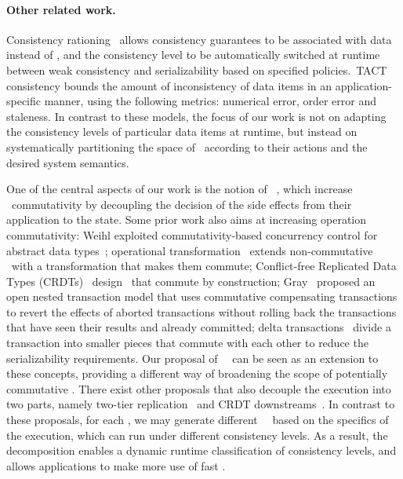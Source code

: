 \paragraph{Other related work.} Consistency rationing~\cite{Kraska2009ConsisRation} allows consistency
guarantees to be associated with data instead of \operations, and the
consistency level to be automatically switched at runtime between
weak consistency and serializability
based on specified policies.\ TACT~\cite{Yu2000TACT} consistency
bounds the amount of inconsistency of data items in an
application-specific manner, using the following metrics: numerical
error, order error and staleness. In contrast to these models, the
focus of our work is not on adapting the consistency levels of
particular data items at runtime, but instead on systematically
partitioning the space of \transactions\ according to their actions
and the desired system semantics.

One of the central aspects of our work is the notion of
\shadow\ \transactions, which increase \operation\ commutativity by
decoupling the decision of the side effects from their application to the state.
Some prior work also aims at increasing operation commutativity: Weihl exploited
com\-mut\-at\-iv\-ity-based concurrency control for abstract data types~\cite{Weihl1988Commutativity}; 
operational transformation~\cite{Ellis1989Concurrency,Feldman2010Sporc} extends
non-co\-mmutative \operations\ with a
transformation that makes them commute; Conflict-free Replicated Data
Types (CRDTs)~\cite{Shapiro2011Conflict} design \operations\ that
commute by construction; Gray~\cite{Gray1981NestedTransactions} proposed
an open nested transaction model that uses commutative compensating
transactions to revert the effects of aborted transactions without
rolling back the transactions that have seen their results and already
committed; delta transactions~\cite{deltaTxBlog} divide a transaction
into smaller pieces that commute with each other to reduce the
serializability requirements.  Our proposal of
\shadow\ \transactions\ can be seen as an extension to these concepts,
providing a different way of broadening the scope of potentially commutative
\transactions. There exist other proposals that also decouple the
execution into two parts, namely two-tier
replication~\cite{Gray1996Dangers} and CRDT
downstreams~\cite{Shapiro2011Conflict}. In contrast to these proposals, for
  each \operation, we may generate different
  \shadow\ \operations\ based on the specifics of the execution,
which can run under different consistency levels. As a result, the decomposition enables a
dynamic runtime classification of consistency levels, and
allows applications to make more use of fast \operations.

